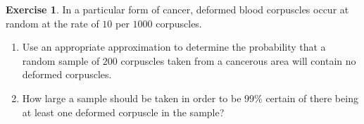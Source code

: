 \documentclass[
]{book}
\theoremstyle{definition}
\theoremstyle{definition}
\theoremstyle{definition}
\newtheorem{exercise}{Exercise}[chapter]
\theoremstyle{definition}
\theoremstyle{remark}
\begin{document}
\begin{exercise}

In a particular form of cancer, deformed blood corpuscles occur at random at the rate of \(10\) per \(1000\) corpuscles.

\begin{enumerate}
\def\labelenumi{\alph{enumi})}
\item
  Use an appropriate approximation to determine the probability that a random sample of \(200\) corpuscles taken from a cancerous area will contain no deformed corpuscles.
\item
  How large a sample should be taken in order to be \(99\%\) certain of there being at least one deformed corpuscle in the sample?
\end{enumerate}

\end{exercise}
\end{document}
